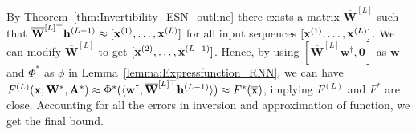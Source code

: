 By Theorem~\ref{thm:Invertibility_ESN_outline} there exists a matrix $\overline{\mathbf{W}}^{[L]}$ such that $\overline{\mathbf{W}}^{[L] \top} \mathbf{h}^{(L-1)} \approx [\mathbf{x}^{(1)}, \ldots, \mathbf{x}^{(L)}]$ for all input sequences $[\mathbf{x}^{(1)}, \ldots, \mathbf{x}^{(L)}]$. We can modify $\overline{\mathbf{W}}^{[L]}$ to get $[\overline{\mathbf{x}}^{(2)}, \ldots, \overline{\mathbf{x}}^{(L-1)}]$. Hence, by using  $[\overline{\mathbf{W}}^{[L]} \mathbf{w}^{\dagger}, \mathbf{0}]$ as $\overline{\mathbf{w}}$ and  $\Phi^{\ast}$ as $\phi$ in Lemma~\ref{lemma:Expressfunction_RNN}, we can have $F^{(L)}(\mathbf{x}; \mathbf{W}^{\ast}, \mathbf{A}^{\ast}) \approx \Phi^{\ast}(\langle \mathbf{w}^{\dagger}, \overline{\mathbf{W}}^{[L]\top} \mathbf{h}^{(L-1)}\rangle) \approx F^{\ast}(\overline{\mathbf{x}})$, implying $F^{(L)}$ and $F^{\ast}$ are close.   Accounting for all the errors in inversion and approximation of function, we get the final bound.
